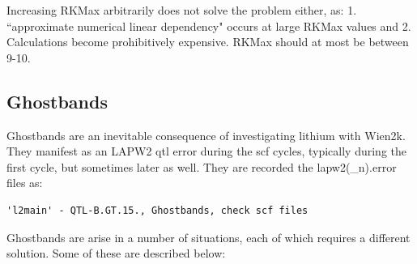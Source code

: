 \documentclass[12pt]{article}
\begin{document}
Increasing RKMax arbitrarily does not solve the problem either, as: 1. ``approximate numerical linear dependency" occurs at large RKMax values and 2. Calculations become prohibitively expensive.  RKMax should at most be  between 9-10.  

\subsection{Ghostbands}
Ghostbands are an inevitable consequence of investigating lithium with Wien2k.  They manifest as an LAPW2 qtl error during the scf cycles, typically during the first cycle, but sometimes later as well. They are recorded the lapw2(\_n).error files as:  

\begin{lstlisting}
'l2main' - QTL-B.GT.15., Ghostbands, check scf files
\end{lstlisting}

Ghostbands are arise in a number of situations, each of which requires a different solution. Some of these are described below: 
\end{document}
